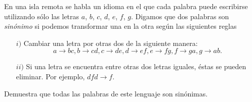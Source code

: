 En una isla remota se habla un idioma en el que cada palabra puede escribirse utilizando sólo las letras $a$, $b$, $c$, $d$, $e$, $f$, $g$. Digamos que dos palabras son {\itshape sinónimo} si podemos transformar una en la otra según las siguientes reglas
\begin{enumerate}
    \item[$i)$]  Cambiar una letra por otras dos de la siguiente manera: \[a \rightarrow bc, b \rightarrow cd, c \rightarrow de, d \rightarrow ef, e \rightarrow fg, f \rightarrow ga, g \rightarrow ab.\]
    \item[$ii)$] Si una letra se encuentra entre otras dos letras iguales, éstas se pueden eliminar. Por ejemplo, $dfd \rightarrow f$.
\end{enumerate}

Demuestra que todas las palabras de este lenguaje son sinónimas.
